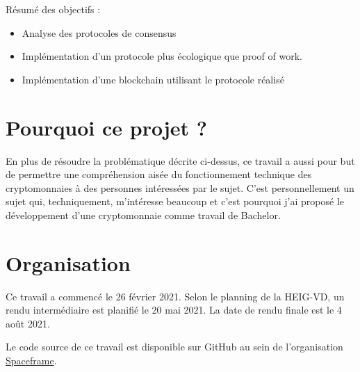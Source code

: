 Résumé des objectifs :
\begin{itemize}
    \item Analyse des protocoles de consensus
    \item Implémentation d'un protocole plus écologique que proof of work.
    \item Implémentation d'une blockchain utilisant le protocole réalisé
\end{itemize}

\section{Pourquoi ce projet ?}

En plus de résoudre la problématique décrite ci-dessus, ce travail a aussi pour but de permettre une compréhension aisée du fonctionnement technique des cryptomonnaies à des personnes intéressées par le sujet. C'est personnellement un sujet qui, techniquement, m'intéresse beaucoup et c'est pourquoi j'ai proposé le développement d'une cryptomonnaie comme travail de Bachelor.

\section{Organisation}

Ce travail a commencé le 26 février 2021.
Selon le planning de la HEIG-VD, un rendu intermédiaire est planifié le 20 mai 2021. La date de rendu finale est le 4 août 2021.

Le code source de ce travail est disponible sur GitHub au sein de l'organisation \href{https://github.com/spaceframeos}{Spaceframe}.